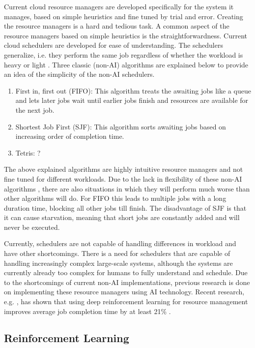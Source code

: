 Current cloud resource managers are developed specifically for the system it
manages, based on simple heuristics and fine tuned by trial and error.
Creating the resource managers is a hard and tedious task. A common aspect of
the resource managers based on simple heuristics is the straightforwardness.
Current cloud schedulers are developed for ease of understanding. The
schedulers generalize, i.e. they perform the same job regardless of whether
the workload is heavy or light \cite{mao2019}. Three classic (non-AI)
algorithms are explained below to provide an idea of the simplicity of the
non-AI schedulers.

\begin{enumerate}
\item First in, first out (FIFO): This algorithm treats the awaiting jobs like
    a queue and lets later jobs wait until earlier jobs finish and resources
    are available for the next job.
\item Shortest Job First (SJF): This algorithm sorts awaiting jobs based on
    increasing order of completion time.
\item Tetris: ? 
\end{enumerate}

The above explained algorithms are highly intuitive resource managers and not
fine tuned for different workloads. Due to the lack in flexibility of these
non-AI algorithms , there are also situations in which they will perform much
worse than other algorithms will do. For FIFO this leads to multiple jobs with
a long duration time, blocking all other jobs till finish. The disadvantage of
SJF is that it can cause starvation, meaning that short jobs are constantly
added and will never be executed.

Currently, schedulers are not capable of handling differences in workload and
have other shortcomings. There is a need for schedulers that are capable of
handling increasingly complex large-scale systems, although the systems are
currently already too complex for humans to fully understand and schedule. Due
to the shortcomings of current non-AI implementations, previous research is
done on implementing these resource managers using AI technology. Recent
research, e.g. , has shown that
using deep reinforcement learning for resource management improves average job
completion time by at least 21\% \cite{mao2019}.


\subsection{Reinforcement Learning}

